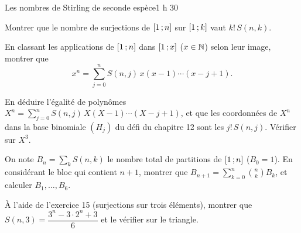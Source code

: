 \begin{defi}{Les nombres de Stirling de seconde espèce}{1 h 30}
\begin{questions}[resume]
  \item Montrer que le nombre de surjections de $\mathopen{[}1\,{;}\,n\mathclose{]}$ sur
    $\mathopen{[}1\,{;}\,k\mathclose{]}$ vaut $k!\,S(n,k)$.
  \item En classant les applications de $\mathopen{[}1\,{;}\,n\mathclose{]}$ dans $\mathopen{[}1\,{;}\,x\mathclose{]}$
    ($x\in\mathbb{N}$) selon leur image, montrer que
    \[
    x^{n}=\sum_{j=0}^{n}S(n,j)\,x(x-1)\cdots(x-j+1) .
    \]
  \item En déduire l'égalité de polynômes
    $X^{n}=\sum_{j=0}^{n}S(n,j)\,X(X-1)\cdots(X-j+1)$, et que les
    coordonnées de $X^{n}$ dans la base binomiale $(H_j)$ du défi du
    chapitre 12 sont les $j!\,S(n,j)$. Vérifier sur $X^{3}$.
\end{questions}

\begin{questions}[resume]
  \item On note $B_n=\sum_kS(n,k)$ le nombre total de partitions de
    $\mathopen{[}1\,{;}\,n\mathclose{]}$ ($B_0=1$). En considérant le bloc qui contient $n+1$,
    montrer que $B_{n+1}=\sum_{k=0}^{n}\binom nkB_k$, et calculer
    $B_1,\dots,B_6$.
  \item À l'aide de l'exercice 15 (surjections sur trois éléments), montrer
    que $S(n,3)=\dfrac{3^{n}-3\cdot2^{n}+3}{6}$ et le vérifier sur le
    triangle.
\end{questions}
\end{defi}
